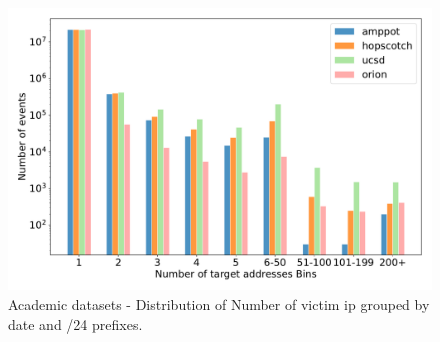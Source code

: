\begin{figure}[htbp]
    \centering
    \includegraphics[scale=0.48]{graphs/GMI_summary_bins.pdf}
    \caption{Academic datasets - Distribution of Number of victim ip grouped by date and /24 prefixes.}
    \label{fig:Mappedaddressanalysis}
\end{figure}




